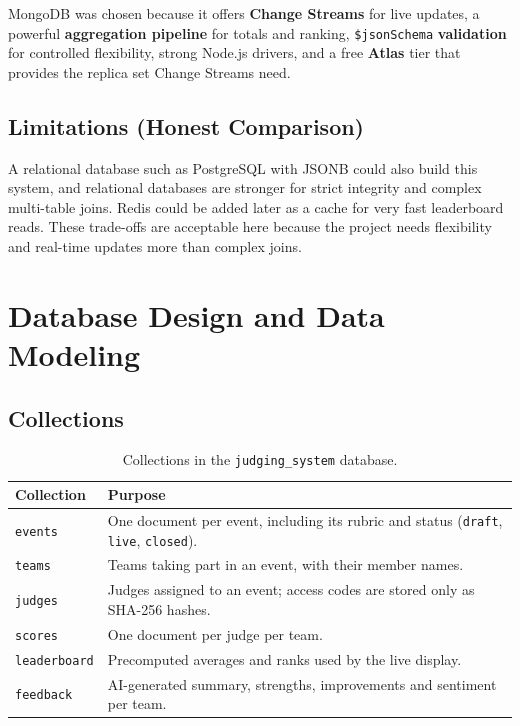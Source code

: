 \documentclass[11pt,a4paper]{article}
\begin{document}
MongoDB was chosen because it offers \textbf{Change Streams} for live updates, a powerful \textbf{aggregation pipeline} for totals and ranking, \texttt{\$jsonSchema} \textbf{validation} for controlled flexibility, strong Node.js drivers, and a free \textbf{Atlas} tier that provides the replica set Change Streams need.

\subsection{Limitations (Honest Comparison)}
A relational database such as PostgreSQL with JSONB could also build this system, and relational databases are stronger for strict integrity and complex multi-table joins. Redis could be added later as a cache for very fast leaderboard reads. These trade-offs are acceptable here because the project needs flexibility and real-time updates more than complex joins.

\section{Database Design and Data Modeling}

\subsection{Collections}
\begin{table}[H]
\centering
\begin{tabularx}{\textwidth}{l X}
\toprule
\textbf{Collection} & \textbf{Purpose} \\
\midrule
\texttt{events}      & One document per event, including its rubric and status (\texttt{draft}, \texttt{live}, \texttt{closed}). \\
\texttt{teams}       & Teams taking part in an event, with their member names. \\
\texttt{judges}      & Judges assigned to an event; access codes are stored only as SHA-256 hashes. \\
\texttt{scores}      & One document per judge per team. \\
\texttt{leaderboard} & Precomputed averages and ranks used by the live display. \\
\texttt{feedback}    & AI-generated summary, strengths, improvements and sentiment per team. \\
\bottomrule
\end{tabularx}
\caption{Collections in the \texttt{judging\_system} database.}
\end{table}
\end{document}

